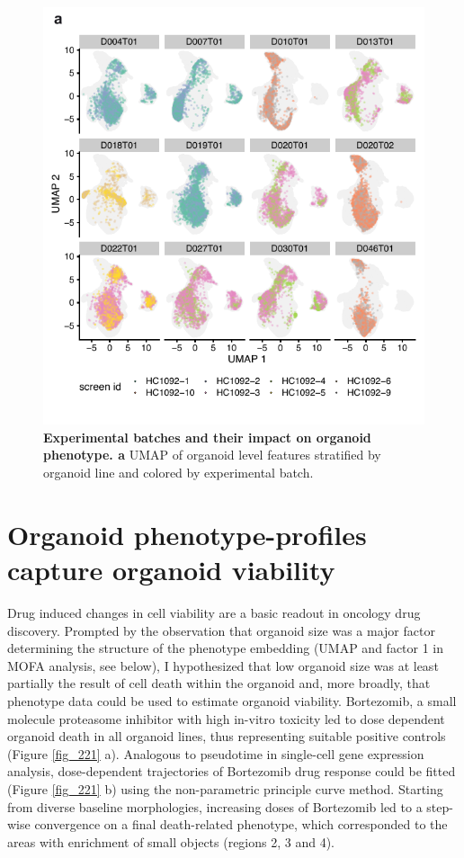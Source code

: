 \begin{flushleft}
\begin{figure}[h]
\centering
\includegraphics[width=\textwidth,
                height=\textheight,
                keepaspectratio]{figures/promise/pdf/fig_1_6.pdf}
\caption{\textbf{Experimental batches and their impact on organoid phenotype. a} UMAP of organoid level features stratified by organoid line and colored by experimental batch.}
\label{fig_216}
\end{figure}
\clearpage


\section{Organoid phenotype-profiles capture organoid viability}

Drug induced changes in cell viability are a basic readout in oncology drug discovery. Prompted by the observation that organoid size was a major factor determining the structure of the phenotype embedding (UMAP and factor 1 in MOFA analysis, see below), I hypothesized that low organoid size was at least partially the result of cell death within the organoid and, more broadly, that phenotype data could be used to estimate organoid viability. Bortezomib, a small molecule proteasome inhibitor with high in-vitro toxicity led to dose dependent organoid death in all organoid lines, thus representing suitable positive controls (Figure \ref{fig_221} a). Analogous to pseudotime in single-cell  gene expression analysis, dose-dependent trajectories of Bortezomib drug response could be fitted (Figure \ref{fig_221} b) using the non-parametric principle curve method. Starting from diverse baseline morphologies, increasing doses of Bortezomib led to a step-wise convergence on a final death-related phenotype, which corresponded to the areas with enrichment of small objects (regions 2, 3 and 4). 


\end{flushleft}

